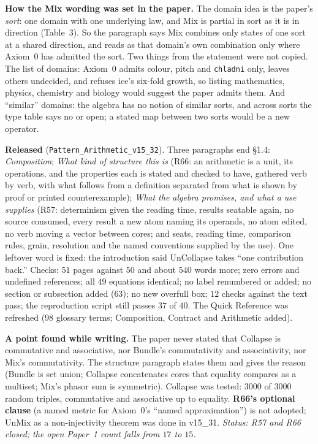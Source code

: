 \documentclass[11pt]{article}
\begin{document}
\textbf{How the Mix wording was set in the paper.} The domain idea is the paper's \emph{sort}: one domain with one underlying law, and Mix is partial in sort as it is in direction (Table~3). So the paragraph says Mix combines only states of one sort at a shared direction, and reads as that domain's own combination only where Axiom~0 has admitted the sort.
Two things from the statement were not copied. The list of domains: Axiom~0 admits colour, pitch and \texttt{chladni} only, leaves others undecided, and refuses ice's six-fold growth, so listing mathematics, physics, chemistry and biology would suggest the paper admits them. And ``similar'' domains: the algebra has no notion of similar sorts, and across sorts the type table says no or open; a stated map between two sorts would be a new operator.

\textbf{Released} (\texttt{Pattern\_Arithmetic\_v15\_32}). Three paragraphs end \S1.4: \emph{Composition}; \emph{What kind of structure this is} (R66: an arithmetic is a unit, its operations, and the properties each is stated and checked to have, gathered verb by verb, with what follows from a definition separated from what is shown by proof or printed counterexample); \emph{What the algebra promises, and what a use supplies} (R57: determinism given the reading time, results seatable again,
no source consumed, every result a new atom naming its operands, no atom edited, no verb moving a vector between cores; and seats, reading time, comparison rules, grain, resolution and the named conventions supplied by the use). One leftover word is fixed: the introduction said UnCollapse takes ``one contribution back.''
Checks: $51$ pages against $50$ and about $540$ words more; zero errors and undefined references; all $49$ equations identical; no label renumbered or added; no section or subsection added ($63$); no new overfull box; $12$ checks against the text pass; the reproduction script still passes $37$ of $40$. The Quick Reference was refreshed ($98$ glossary terms; Composition, Contract and Arithmetic added).

\textbf{A point found while writing.} The paper never stated that Collapse is commutative and associative, nor Bundle's commutativity and associativity, nor Mix's commutativity. The structure paragraph states them and gives the reason (Bundle is set union; Collapse concatenates cores that equality compares as a multiset; Mix's phasor sum is symmetric). Collapse was tested: $3000$ of $3000$ random triples, commutative and associative up to equality.
\textbf{R66's optional clause} (a named metric for Axiom~0's ``named approximation'') is not adopted; UnMix as a non-injectivity theorem was done in v15\_31.
\emph{Status: R57 and R66 closed; the open Paper~1 count falls from $17$ to $15$.}
\end{document}
